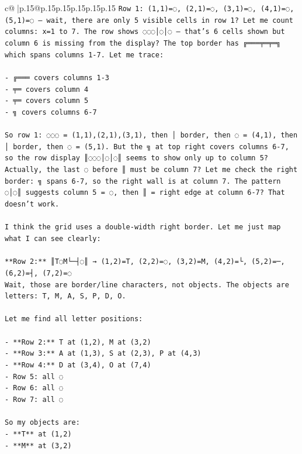 \documentclass{article}
\begin{document}
{\begin{supertabular}{c@{$\;$}|p{.15\linewidth}@{}p{.15\linewidth}p{.15\linewidth}p{.15\linewidth}p{.15\linewidth}p{.15\linewidth}}
{{{\texttt{Row 1: (1,1)=◌, (2,1)=◌, (3,1)=◌, (4,1)=◌, (5,1)=◌ — wait, there are only 5 visible cells in row 1? Let me count columns: x=1 to 7. The row shows ◌◌◌│◌│◌ — that's 6 cells shown but column 6 is missing from the display? The top border has ╔═══╤═╤═╗ which spans columns 1{-}7. Let me trace:} \\
\\ 
\texttt{{-} ╔═══ covers columns 1{-}3} \\
\texttt{{-} ╤═ covers column 4} \\
\texttt{{-} ╤═ covers column 5} \\
\texttt{{-} ╗ covers columns 6{-}7} \\
\\ 
\texttt{So row 1: ◌◌◌ = (1,1),(2,1),(3,1), then │ border, then ◌ = (4,1), then │ border, then ◌ = (5,1). But the ╗ at top right covers columns 6{-}7, so the row display ║◌◌◌│◌│◌║ seems to show only up to column 5? Actually, the last ◌ before ║ must be column 7? Let me check the right border: ╗ spans 6{-}7, so the right wall is at column 7. The pattern ◌│◌║ suggests column 5 = ◌, then ║ = right edge at column 6{-}7? That doesn't work.} \\
\\ 
\texttt{I think the grid uses a double{-}width right border. Let me just map what I can see clearly:} \\
\\ 
\texttt{**Row 2:** ║T◌M└─┤◌║ → (1,2)=T, (2,2)=◌, (3,2)=M, (4,2)=└, (5,2)=─, (6,2)=┤, (7,2)=◌} \\
\texttt{Wait, those are border/line characters, not objects. The objects are letters: T, M, A, S, P, D, O.} \\
\\ 
\texttt{Let me find all letter positions:} \\
\\ 
\texttt{{-} **Row 2:** T at (1,2), M at (3,2)} \\
\texttt{{-} **Row 3:** A at (1,3), S at (2,3), P at (4,3)} \\
\texttt{{-} **Row 4:** D at (3,4), O at (7,4)} \\
\texttt{{-} Row 5: all ◌} \\
\texttt{{-} Row 6: all ◌  } \\
\texttt{{-} Row 7: all ◌} \\
\\ 
\texttt{So my objects are:} \\
\texttt{{-} **T** at (1,2)} \\
\texttt{{-} **M** at (3,2)} \\
}}}
\end{supertabular}}
\end{document}
